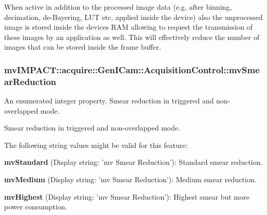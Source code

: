 When active in addition to the processed image data (e.\+g. after binning, decimation, de-\/\+Bayering, L\+U\+T etc. applied inside the device) also the unprocessed image is stored inside the devices R\+A\+M allowing to request the transmission of these images by an application as well. This will effectively reduce the number of images that can be stored inside the frame buffer. \hypertarget{classmv_i_m_p_a_c_t_1_1acquire_1_1_gen_i_cam_1_1_acquisition_control_af60f090cba8f031a11e0b9ebbfba0c6f}{
\subsubsection[{mv\+Smear\+Reduction}]{ mv\+I\+M\+P\+A\+C\+T\+::acquire\+::\+Gen\+I\+Cam\+::\+Acquisition\+Control\+::mv\+Smear\+Reduction}}\label{classmv_i_m_p_a_c_t_1_1acquire_1_1_gen_i_cam_1_1_acquisition_control_af60f090cba8f031a11e0b9ebbfba0c6f}


An enumerated integer property. Smear reduction in triggered and non-\/overlapped mode. 

Smear reduction in triggered and non-\/overlapped mode.

The following string values might be valid for this feature\+:
\begin{DoxyItemize}
\item {\bfseries mv\+Standard} (Display string\+: 'mv Smear Reduction')\+: Standard smear reduction.
\item {\bfseries mv\+Medium} (Display string\+: 'mv Smear Reduction')\+: Medium smear reduction.
\item {\bfseries mv\+Highest} (Display string\+: 'mv Smear Reduction')\+: Highest smear but more power consumption.
\end{DoxyItemize}

